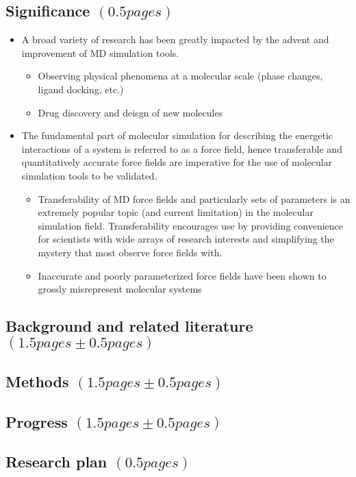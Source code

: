 \documentclass[aps,pre,onecolumn,nofootinbib,superscriptaddress,linenumbers,12pt, draft,tightenlines]{revtex4-1}
\begin{document}
\subsection{Significance $\left(0.5 pages\right)$}
\begin{itemize}
 \item A broad variety of research has been greatly impacted by the advent and improvement of MD simulation tools.  
  \begin{itemize}
   \item Observing physical phenomena at a molecular scale (phase changes, ligand docking, etc.)\cite{villin}
   \item Drug discovery and deisgn of new molecules\cite{drug_discov}
  \end{itemize}
 \item The fundamental part of molecular simulation for describing the energetic interactions of a system is referred to as a force field, hence transferable and quantitatively accurate force fields are imperative for the use of molecular simulation tools to be validated.
  \begin{itemize}
   \item Transferability of MD force fields and particularly sets of parameters is an extremely popular topic (and current limitation) in the molecular simulation field.\cite{transferability1,transferability2,transferability3,transferability4} Transferability encourages use by providing convenience for scientists with wide arrays of research interests and simplifying the mystery that most observe force fields with.
   \item Inaccurate and poorly parameterized force fields have been shown to grossly misrepresent molecular systems\cite{ffcomp1,ffcomp2}
  \end{itemize}
\end{itemize}


\subsection{Background and related literature $\left(1.5 pages \pm 0.5 pages\right)$}

\subsection{Methods $\left(1.5 pages \pm 0.5 pages\right)$}

\subsection{Progress $\left(1.5 pages \pm 0.5 pages\right)$}

\subsection{Research plan $\left(0.5 pages\right)$}



\end{document}
